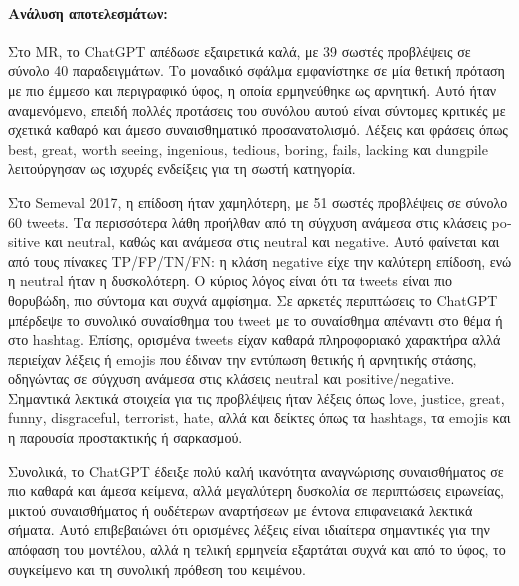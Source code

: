\documentclass[11pt,a4paper]{article}
\begin{document}
\paragraph{Ανάλυση αποτελεσμάτων:}

Στο \textlatin{MR}, το \textlatin{ChatGPT} απέδωσε εξαιρετικά καλά, με 39 σωστές προβλέψεις σε σύνολο 40 παραδειγμάτων. Το μοναδικό σφάλμα εμφανίστηκε σε μία θετική πρόταση με πιο έμμεσο και περιγραφικό ύφος, η οποία ερμηνεύθηκε ως αρνητική. Αυτό ήταν αναμενόμενο, επειδή πολλές προτάσεις του συνόλου αυτού είναι σύντομες κριτικές με σχετικά καθαρό και άμεσο συναισθηματικό προσανατολισμό. Λέξεις και φράσεις όπως \textlatin{best}, \textlatin{great}, \textlatin{worth seeing}, \textlatin{ingenious}, \textlatin{tedious}, \textlatin{boring}, \textlatin{fails}, \textlatin{lacking} και \textlatin{dungpile} λειτούργησαν ως ισχυρές ενδείξεις για τη σωστή κατηγορία.

Στο \textlatin{Semeval 2017}, η επίδοση ήταν χαμηλότερη, με 51 σωστές προβλέψεις σε σύνολο 60 \textlatin{tweets}. Τα περισσότερα λάθη προήλθαν από τη σύγχυση ανάμεσα στις κλάσεις \textlatin{positive} και \textlatin{neutral}, καθώς και ανάμεσα στις \textlatin{neutral} και \textlatin{negative}. Αυτό φαίνεται και από τους πίνακες \textlatin{TP/FP/TN/FN}: η κλάση \textlatin{negative} είχε την καλύτερη επίδοση, ενώ η \textlatin{neutral} ήταν η δυσκολότερη. Ο κύριος λόγος είναι ότι τα \textlatin{tweets} είναι πιο θορυβώδη, πιο σύντομα και συχνά αμφίσημα. Σε αρκετές περιπτώσεις το \textlatin{ChatGPT} μπέρδεψε το συνολικό συναίσθημα του \textlatin{tweet} με το συναίσθημα απέναντι στο θέμα ή στο \textlatin{hashtag}. Επίσης, ορισμένα \textlatin{tweets} είχαν καθαρά πληροφοριακό χαρακτήρα αλλά περιείχαν λέξεις ή \textlatin{emojis} που έδιναν την εντύπωση θετικής ή αρνητικής στάσης, οδηγώντας σε σύγχυση ανάμεσα στις κλάσεις \textlatin{neutral} και \textlatin{positive/negative}. Σημαντικά λεκτικά στοιχεία για τις προβλέψεις ήταν λέξεις όπως \textlatin{love}, \textlatin{justice}, \textlatin{great}, \textlatin{funny}, \textlatin{disgraceful}, \textlatin{terrorist}, \textlatin{hate}, αλλά και δείκτες όπως τα \textlatin{hashtags}, τα \textlatin{emojis} και η παρουσία προστακτικής ή σαρκασμού.

Συνολικά, το \textlatin{ChatGPT} έδειξε πολύ καλή ικανότητα αναγνώρισης συναισθήματος σε πιο καθαρά και άμεσα κείμενα, αλλά μεγαλύτερη δυσκολία σε περιπτώσεις ειρωνείας, μικτού συναισθήματος ή ουδέτερων αναρτήσεων με έντονα επιφανειακά λεκτικά σήματα. Αυτό επιβεβαιώνει ότι ορισμένες λέξεις είναι ιδιαίτερα σημαντικές για την απόφαση του μοντέλου, αλλά η τελική ερμηνεία εξαρτάται συχνά και από το ύφος, το συγκείμενο και τη συνολική πρόθεση του κειμένου.
\end{document}

